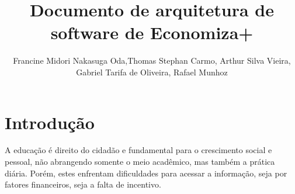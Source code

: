 \documentclass[
	article,			%
	12pt,				%
	oneside,			%
	a4paper,			%
	english,			%
	brazil,				%
	sumario=tradicional
	]{abntex2}
\title{Documento de arquitetura de software de Economiza+}
\author{Francine Midori Nakasuga Oda\inst{1},Thomas Stephan Carmo\inst{1}, Arthur Silva Vieira\inst{1},\\ Gabriel Tarifa de Oliveira\inst{1}, Rafael Munhoz\inst{1} }
\begin{document}


\frenchspacing 


%
%

\maketitle







\textual

\section{Introdução}
    
    A educação é direito do cidadão e fundamental para o crescimento social e pessoal, não abrangendo somente o meio acadêmico, mas também a prática diária. Porém, estes enfrentam dificuldades para acessar a informação, seja por fatores financeiros, seja a falta de incentivo. 
    
\end{document}
